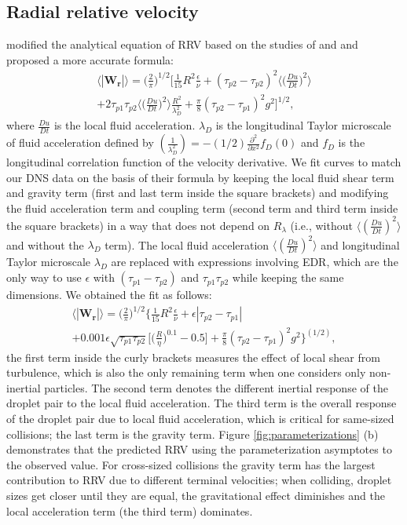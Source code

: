 \subsection{Radial relative velocity}
\citet{Wang1998b} modified the analytical equation of RRV based on the studies of \citet{Saffman1956} and \citet{Hu1997} and proposed a more accurate formula:
\begin{multline}
\langle|\mathbf{W_r}|\rangle=\Big( \frac{2}{\pi} \Big)^{1/2}\bigg[ \frac{1}{15}R^2\frac{\epsilon}{\nu} + (\tau_{p2}-\tau_{p2})^2 \bigg\langle\bigg( \frac{Du}{Dt} \bigg)^2 \bigg\rangle \\
+ 2\tau_{p1}\tau_{p2} \bigg\langle \bigg( \frac{Du}{Dt} \bigg)^2 \bigg\rangle \frac{R^2}{\lambda_D^2} +\frac{\pi}{8}(\tau_{p2}-\tau_{p1})^2g^2\bigg]^{1/2}, \label{eqn:Wangpararrv}
\end{multline}
where $\frac{Du}{Dt}$ is the local fluid acceleration. $\lambda_D$ is the longitudinal Taylor microscale of fluid acceleration defined by $(\frac{1}{\lambda^2_D}) = -(1/2)\frac{\partial^2}{\partial x^2}f_D(0)$ and $f_D$ is the longitudinal correlation function of the velocity derivative. We fit curves to match our DNS data on the basis of their formula by keeping the local fluid shear term and gravity term (first and last term inside the square brackets) and modifying the fluid acceleration term and coupling term (second term and third term inside the square brackets) in a way that does not depend on $R_\lambda$ (i.e., without $\big\langle (\frac{Du}{Dt})^2\big\rangle$ and without the $\lambda_D$ term). The local fluid acceleration $\langle(\frac{Du}{Dt})^2\rangle$  and longitudinal Taylor microscale $\lambda_D$ are replaced with expressions involving EDR, which are the only way to use $\epsilon$ with $(\tau_{p1} - \tau_{p2})$ and $\tau_{p1}\tau_{p2}$ while keeping the same dimensions. We obtained the fit as follows:
\begin{multline}
\langle|\mathbf{W_r}|\rangle = \Bigg(\frac{2}{\pi}\Bigg)^{1/2} \Bigg\{\frac{1}{15}R^2\frac{\epsilon}{\nu} +\epsilon|\tau_{p2}-\tau_{p1}|\\
+ 0.001\epsilon\sqrt{\tau_{p1}\tau_{p2}}\bigg[ \bigg( \frac{R}{\eta}\bigg)^{0.1}-0.5 \bigg]
+\frac{\pi}{8}(\tau_{p2}-\tau_{p1})^2g^2 \Bigg\}^{(1/2)}, \label{eqn:pararrv}
\end{multline}
the first term inside the curly brackets measures the effect of local shear from turbulence, which is also the only remaining term when one considers only non-inertial particles. The second term denotes the different inertial response of the droplet pair to the local fluid acceleration. The third term is the overall response of the droplet pair due to local fluid acceleration, which is critical for same-sized collisions; the last term is the gravity term.  Figure \ref{fig:parameterizations} (b) demonstrates that the predicted RRV using the parameterization asymptotes to the observed value. For cross-sized collisions the gravity term has the largest contribution to RRV due to different terminal velocities; when colliding, droplet sizes get closer until they are equal, the gravitational effect diminishes and the local acceleration term (the third term) dominates. 

